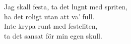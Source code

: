 \documentclass[a6paper, 10pt, twoside]{article}
\begin{document}

%
\begin{center}
\end{center}
Jag skall festa, ta det lugnt med spriten,\\
ha det roligt utan att va' full.\\
Inte krypa runt med festeliten,\\
ta det sansat för min egen skull.
\vspace{5pt} \\
\end{document}
